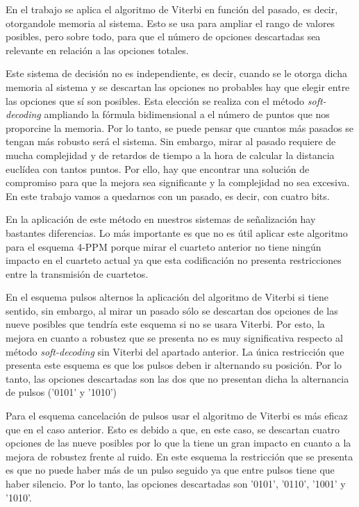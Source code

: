 En el trabajo se aplica el algoritmo de Viterbi en función del pasado, es decir, 
otorgandole memoria al sistema. Esto se usa para ampliar el rango de valores posibles, 
pero sobre todo, para que el número de opciones descartadas sea relevante en relación a
las opciones totales.

Este sistema de decisión no es independiente, es decir, cuando se le otorga dicha 
memoria al sistema y se descartan las opciones no probables hay que elegir entre las
opciones que sí son posibles. Esta elección se realiza con el método 
\textit{soft-decoding} ampliando la fórmula bidimensional a el número de puntos que 
nos proporcine la memoria. Por lo tanto, se puede pensar que cuantos más pasados 
se tengan más robusto será el sistema. Sin embargo, mirar al pasado requiere de mucha
complejidad y de retardos de tiempo a la hora de calcular la distancia euclídea con 
tantos puntos. Por ello, hay que encontrar una solución de compromiso para que la mejora
sea significante y la complejidad no sea excesiva. En este trabajo vamos a quedarnos 
con un pasado, es decir, con cuatro bits.

En la aplicación de este método en nuestros sistemas de señalización hay bastantes 
diferencias. Lo más importante es que no es útil aplicar este algoritmo para 
el esquema 4-PPM porque mirar el cuarteto anterior no tiene ningún impacto en el 
cuarteto actual ya que esta codificación no presenta restricciones entre la 
transmisión de cuartetos.

En el esquema pulsos alternos la aplicación del algoritmo de Viterbi si tiene sentido,
sin embargo, al mirar un pasado sólo se descartan dos opciones de las nueve posibles 
que tendría este esquema si no se usara Viterbi. Por esto, la mejora en cuanto a 
robustez que se presenta no es muy significativa respecto al método \textit{soft-decoding}
sin Viterbi del apartado anterior. La única restricción que presenta este esquema es que 
los pulsos deben ir alternando su posición. Por lo tanto,
las opciones descartadas son las dos que no presentan dicha 
la alternancia de pulsos ('0101' y '1010')

Para el esquema cancelación de pulsos usar el algoritmo de Viterbi es más eficaz que 
en el caso anterior. Esto es debido a que, en este caso, se descartan cuatro opciones de 
las nueve posibles por lo que la tiene un gran impacto en cuanto a la mejora de 
robustez frente al ruido. En este esquema la restricción que se presenta es que no puede 
haber más de un pulso seguido ya que entre pulsos tiene que haber silencio.
Por lo tanto, las opciones descartadas son '0101', '0110', '1001' y '1010'.

